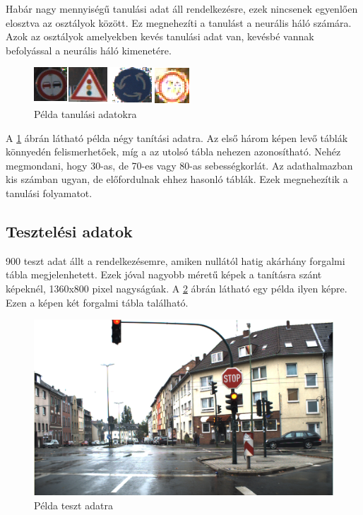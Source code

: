 Habár nagy mennyiségű tanulási adat áll rendelkezésre, ezek nincsenek egyenlően elosztva az osztályok között. Ez megnehezíti a tanulást a neurális háló számára. Azok az osztályok amelyekben kevés tanulási adat van, kevésbé vannak befolyással a neurális háló kimenetére. 

\begin{figure}
\centering

\includegraphics{images/train}
\caption{Példa tanulási adatokra}

\label{fig:trainingImage}
\end{figure}

A \ref{fig:trainingImage} ábrán látható példa négy tanítási adatra. Az első három képen levő táblák könnyedén felismerhetőek, míg a az utolsó tábla nehezen azonosítható. Nehéz megmondani, hogy 30-as, de 70-es vagy 80-as sebességkorlát. Az adathalmazban kis számban ugyan, de előfordulnak ehhez hasonló táblák. Ezek megnehezítik a tanulási folyamatot.

\subsection{Tesztelési adatok}

900 teszt adat állt a rendelkezésemre, amiken nullától hatig akárhány forgalmi tábla megjelenhetett. Ezek jóval nagyobb méretű képek a tanításra szánt képeknél, 1360x800 pixel nagyságúak. A \ref{fig:testImage} ábrán látható egy példa ilyen képre. Ezen a képen két forgalmi tábla található.

\begin{figure}[h]
\centering

\includegraphics[scale=0.4]{testImage}
\caption{Példa teszt adatra}

\label{fig:testImage}
\end{figure}

